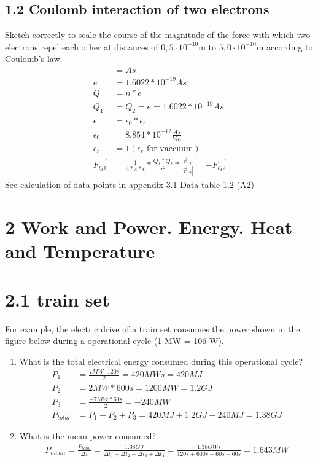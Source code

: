 \documentclass[10pt,ngerman]{scrartcl}
\begin{document}
\subsection{1.2 Coulomb interaction of two electrons}
Sketch correctly to scale the course of the magnitude of the force with which two electrons repel each other at distances of $0,5 \cdot 10^{-10}$m to $5,0 \cdot 10^{-10}$m according to Coulomb's law.
\begin{align*}
	[Q] &= As \\
	e &= 1.6022 * 10^{-19} As \\
	Q &= n * e \\
	Q_{1} &= Q_{2} = e = 1.6022 * 10^{-19} As \\
	\epsilon &= \epsilon_{0} * \epsilon_{r} \\
	\epsilon_{0} &= 8.854 * 10^{-12} \frac{As}{Vm} \\
	\epsilon_{r} &= 1 (\epsilon_{r} \text{ for vaccuum})\\
	\vec{F_{Q1}} &= \frac{1}{4 * \pi * \epsilon } * \frac{Q_{1}*Q_{2}}{r^{2}} * \frac{\vec{r}_{12}}{|\vec{r}_{12}|} = -\vec{F_{Q2}}
\end{align*}
See calculation of data points in appendix \hyperref[sec:data-table-a2]{3.1 Data table 1.2 (A2)}

\begin{landscape}
 
\end{landscape}

\newpage
\section{2 Work and Power. Energy. Heat and Temperature}
\section{2.1 train set}
For example, the electric drive of a train set consumes the power shown in the figure below during a operational cycle (1 MW = 106 W).

\begin{enumerate}
	\item What is the total electrical energy consumed during this operational cycle?
	\begin{align}
		P_{1} &= \frac{7MW\cdot 120s}{2} = 420MWs = 420MJ\\
		P_{2} &= 2 MW * 600s = 1200 MW = 1.2 GJ\\
		P_{3} &= \frac{-7MW * 60s}{2} = -240 MW\\
		P_{total} &= P_{1} + P_{2} + P_{3} = 420MJ + 1.2 GJ - 240 MJ = 1.38 GJ
	\end{align}
	\item What is the mean power consumed?
	\begin{align}
        P_{mean} = \frac{P_{total}}{\Delta t} = \frac{1.38 GJ}{\Delta t_{1} +\Delta t_{2} +\Delta t_{3} +\Delta t_{4}}
		= \frac{1.38GWs}{120s + 600s + 60s + 60s} = 1.643MW
    \end{align}
\end{enumerate}
\end{document}
